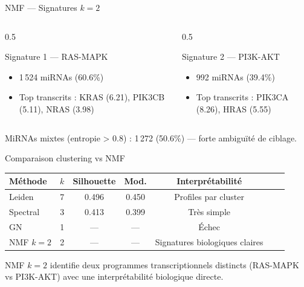 \begin{frame}{NMF — Signatures $k=2$}
\begin{columns}
\begin{column}{0.5\textwidth}
\begin{block}{Signature 1 — RAS-MAPK}
\begin{itemize}
  \small
  \item 1\,524 miRNAs (60.6\%)
  \item Top transcrits : KRAS (6.21), PIK3CB (5.11), NRAS (3.98)
\end{itemize}
\end{block}
\end{column}

\begin{column}{0.5\textwidth}
\begin{block}{Signature 2 — PI3K-AKT}
\begin{itemize}
  \small
  \item 992 miRNAs (39.4\%)
  \item Top transcrits : PIK3CA (8.26), HRAS (5.55)
\end{itemize}
\end{block}
\end{column}
\end{columns}

\vspace{1em}
MiRNAs mixtes (entropie > 0.8) : 1\,272 (50.6\%) — forte ambiguïté de ciblage.
\end{frame}

\begin{frame}{Comparaison clustering vs NMF}
\begin{table}
\centering
\scriptsize
\begin{tabular}{@{} lcccccc @{}}
  \toprule
  \textbf{Méthode} & \textbf{$k$} & \textbf{Silhouette} & \textbf{Mod.} & \textbf{Interprétabilité} \\
  \midrule
  Leiden & 7 & 0.496 & 0.450 & Profiles par cluster \\
  Spectral & 3 & 0.413 & 0.399 & Très simple \\
  GN & 1 & — & — & Échec \\
  NMF $k=2$ & 2 & — & — & Signatures biologiques claires \\
  \bottomrule
\end{tabular}
\end{table}

\vspace{0.5em}
\small
NMF $k=2$ identifie deux programmes transcriptionnels distincts (RAS-MAPK vs PI3K-AKT) avec une interprétabilité biologique directe.
\end{frame}
